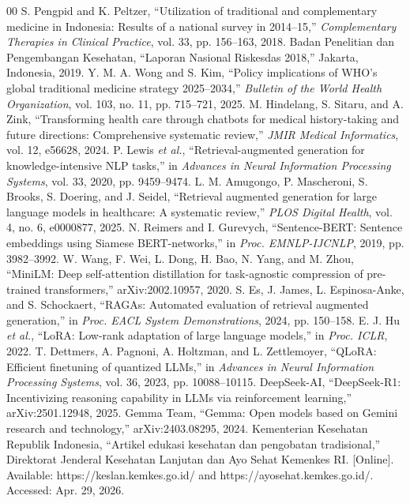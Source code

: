 \documentclass[conference]{IEEEtran}
\begin{document}
\begin{thebibliography}{00}
 S. Pengpid and K. Peltzer, ``Utilization of traditional and complementary medicine in Indonesia: Results of a national survey in 2014--15,'' \emph{Complementary Therapies in Clinical Practice}, vol. 33, pp. 156--163, 2018.
 Badan Penelitian dan Pengembangan Kesehatan, ``Laporan Nasional Riskesdas 2018,'' Jakarta, Indonesia, 2019.
 Y. M. A. Wong and S. Kim, ``Policy implications of WHO's global traditional medicine strategy 2025--2034,'' \emph{Bulletin of the World Health Organization}, vol. 103, no. 11, pp. 715--721, 2025.
 M. Hindelang, S. Sitaru, and A. Zink, ``Transforming health care through chatbots for medical history-taking and future directions: Comprehensive systematic review,'' \emph{JMIR Medical Informatics}, vol. 12, e56628, 2024.
 P. Lewis \emph{et al.}, ``Retrieval-augmented generation for knowledge-intensive NLP tasks,'' in \emph{Advances in Neural Information Processing Systems}, vol. 33, 2020, pp. 9459--9474.
 L. M. Amugongo, P. Mascheroni, S. Brooks, S. Doering, and J. Seidel, ``Retrieval augmented generation for large language models in healthcare: A systematic review,'' \emph{PLOS Digital Health}, vol. 4, no. 6, e0000877, 2025.
 N. Reimers and I. Gurevych, ``Sentence-BERT: Sentence embeddings using Siamese BERT-networks,'' in \emph{Proc. EMNLP-IJCNLP}, 2019, pp. 3982--3992.
 W. Wang, F. Wei, L. Dong, H. Bao, N. Yang, and M. Zhou, ``MiniLM: Deep self-attention distillation for task-agnostic compression of pre-trained transformers,'' arXiv:2002.10957, 2020.
 S. Es, J. James, L. Espinosa-Anke, and S. Schockaert, ``RAGAs: Automated evaluation of retrieval augmented generation,'' in \emph{Proc. EACL System Demonstrations}, 2024, pp. 150--158.
 E. J. Hu \emph{et al.}, ``LoRA: Low-rank adaptation of large language models,'' in \emph{Proc. ICLR}, 2022.
 T. Dettmers, A. Pagnoni, A. Holtzman, and L. Zettlemoyer, ``QLoRA: Efficient finetuning of quantized LLMs,'' in \emph{Advances in Neural Information Processing Systems}, vol. 36, 2023, pp. 10088--10115.
 DeepSeek-AI, ``DeepSeek-R1: Incentivizing reasoning capability in LLMs via reinforcement learning,'' arXiv:2501.12948, 2025.
 Gemma Team, ``Gemma: Open models based on Gemini research and technology,'' arXiv:2403.08295, 2024.
 Kementerian Kesehatan Republik Indonesia, ``Artikel edukasi kesehatan dan pengobatan tradisional,'' Direktorat Jenderal Kesehatan Lanjutan dan Ayo Sehat Kemenkes RI. [Online]. Available: https://keslan.kemkes.go.id/ and https://ayosehat.kemkes.go.id/. Accessed: Apr. 29, 2026.

\end{thebibliography}
\end{document}

